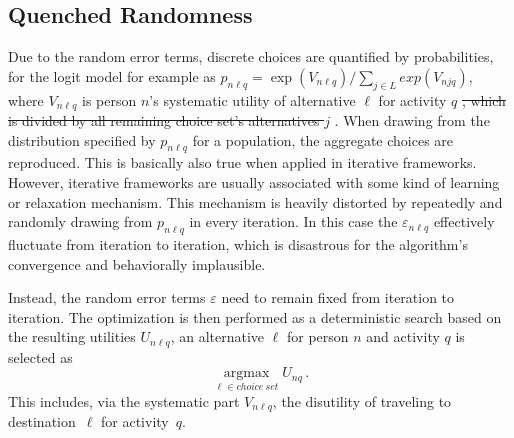 \subsection{Quenched Randomness}
Due to the random error terms, discrete choices are quantified by probabilities, for the logit model for example as $p_{n\ell q} = \exp(V_{n\ell q}) / \sum_{j \in L} exp(V_{njq})$, where $V_{n\ell q}$ is person $n$'s systematic utility of alternative $\ell$ for activity $q$ \st{, which is divided by all remaining choice set's alternatives $j$}  . 
When drawing from the distribution specified by $p_{n\ell 
  q}$ for a population, the aggregate choices are reproduced. 
This is basically also true when applied in iterative frameworks. 
However, iterative frameworks are usually associated with some kind of learning or relaxation mechanism. 
This mechanism is heavily distorted by repeatedly and randomly drawing from $p_{n\ell q}$ in every iteration. 
In this case the $\varepsilon_{n\ell q}$ {\orange effectively} fluctuate from iteration to iteration, which is disastrous for the algorithm's convergence and behaviorally implausible.

Instead, the random error terms $\varepsilon$ need to remain fixed from iteration to iteration. 
The optimization is then performed as a deterministic search based on the resulting utilities $U_{n\ell q}$, \ie an alternative $\ell$ for person $n$ and activity $q$ is selected as 
\[ 
\underset{\ell \in choice\: set}{\operatorname{argmax}} U_{nq} \,.
\] 
This includes, via the systematic part $V_{n\ell q}$, the disutility of traveling to destination~$\ell$ for activity~$q$.

